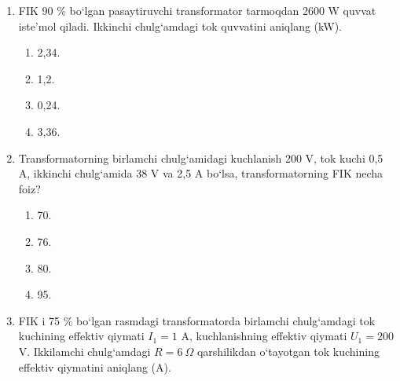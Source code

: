 \begin{enumerate}
\begin{center}
\end{center}

\begin{enumerate}[label=\Alph*)]
\item 1/8.
\item 1/6.
\item 4.
\item 8.
\end{enumerate}

\item FIK 90 \% bo‘lgan pasaytiruvchi transformator tarmoqdan 2600 W quvvat iste’mol qiladi. Ikkinchi chulg‘amdagi tok quvvatini aniqlang (kW).
\begin{enumerate}[label=\Alph*)]
\item 2,34.
\item 1,2.
\item 0,24.
\item 3,36.
\end{enumerate}

\item Transformatorning birlamchi chulg‘amidagi kuchlanish 200 V, tok kuchi 0,5 A, ikkinchi chulg‘amida 38 V va 2,5 A bo‘lsa, transformatorning FIK necha foiz?
\begin{enumerate}[label=\Alph*)]
\item 70.
\item 76.
\item 80.
\item 95.
\end{enumerate}

\item FIK i 75 \% bo‘lgan rasmdagi transformatorda birlamchi chulg‘amdagi tok kuchining effektiv qiymati $I_1 = 1$ A, kuchlanishning effektiv qiymati $U_1 = 200$ V. Ikkilamchi chulg‘amdagi $R = 6\ \Omega$ qarshilikdan o‘tayotgan tok kuchining effektiv qiymatini aniqlang (A).


\end{enumerate}
